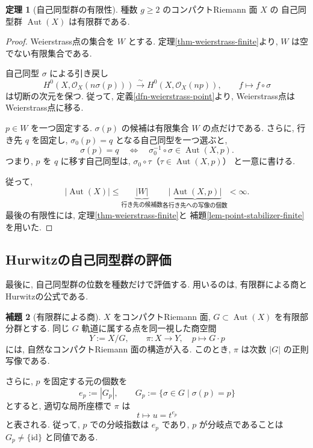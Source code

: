 \documentclass[dvipdfmx,a4paper,11pt]{article} %
\theoremstyle{definition}
\newtheorem{thm}{定理}[section]
\numberwithin{equation}{section}
\newtheorem{lem}[thm]{補題}
\begin{document}
\begin{thm}[自己同型群の有限性]\label{thm-aut-finite}
種数 $g\geq2$ のコンパクトRiemann 面 $X$ の
自己同型群 $\operatorname{Aut}(X)$ は有限群である.
\end{thm}
\begin{proof}
Weierstrass点の集合を $W$ とする.
定理\ref{thm-weierstrass-finite}より,
$W$ は空でない有限集合である.

自己同型 $\sigma$ による引き戻し
\[
H^0(X,\mathcal O_X(n\sigma(p)))
\xrightarrow{\sim}H^0(X,\mathcal O_X(np)),
\qquad f\longmapsto f\circ\sigma
\]
は切断の次元を保つ.
従って, 定義\ref{dfn-weierstrass-point}より,
Weierstrass点はWeierstrass点に移る.

$p\in W$ を一つ固定する.
$\sigma(p)$ の候補は有限集合 $W$ の点だけである.
さらに, 行き先 $q$ を固定し,
$\sigma_0(p)=q$ となる自己同型を一つ選ぶと,
\[
\sigma(p)=q
\quad\Longleftrightarrow\quad
\sigma_0^{-1}\circ\sigma\in\operatorname{Aut}(X,p).
\]
つまり, $p$ を $q$ に移す自己同型は,
$\sigma_0\circ\tau$（$\tau\in\operatorname{Aut}(X,p)$）
と一意に書ける.

従って,
\[
|\operatorname{Aut}(X)|
\leq
\underbrace{|W|}_{\text{行き先の候補数}}
\underbrace{|\operatorname{Aut}(X,p)|}_{\text{各行き先への写像の個数}}
<\infty.
\]
最後の有限性には,
定理\ref{thm-weierstrass-finite}と
補題\ref{lem-point-stabilizer-finite}を用いた.
\end{proof}

\subsection{Hurwitzの自己同型群の評価}

最後に, 自己同型群の位数を種数だけで評価する.
用いるのは, 有限群による商とHurwitzの公式である.

\begin{lem}[有限群による商]\label{lem-finite-group-quotient}
$X$ をコンパクトRiemann 面,
$G\subset\operatorname{Aut}(X)$ を有限部分群とする.
同じ $G$ 軌道に属する点を同一視した商空間
\[
Y:=X/G,\qquad
\pi:X\longrightarrow Y,\quad p\longmapsto G\cdot p
\]
には, 自然なコンパクトRiemann 面の構造が入る.
このとき, $\pi$ は次数 $|G|$ の正則写像である.

さらに, $p$ を固定する元の個数を
\[
e_p:=|G_p|,\qquad
G_p:=\{\sigma\in G\mid\sigma(p)=p\}
\]
とすると, 適切な局所座標で $\pi$ は
\[
t\longmapsto u=t^{e_p}
\]
と表される.
従って, $p$ での分岐指数は $e_p$ であり,
$p$ が分岐点であることは $G_p\neq\{\mathrm{id}\}$ と同値である.
\end{lem}
\end{document}
